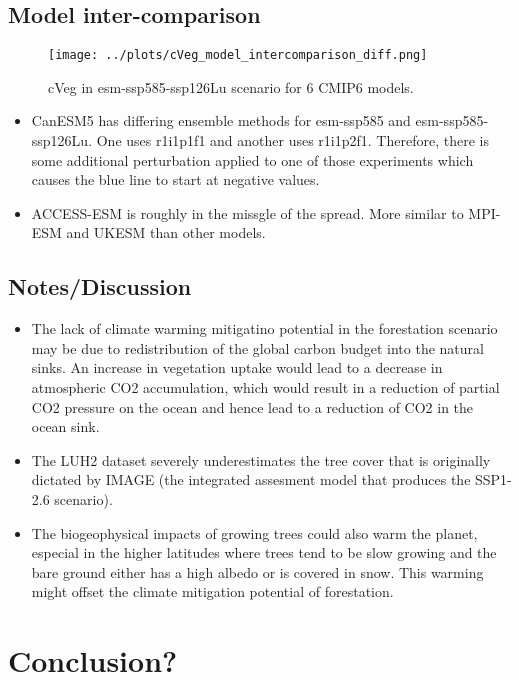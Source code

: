\documentclass[]{article}
\begin{document}
\subsection{Model inter-comparison}

\begin{figure}[H]
    \centering
    \texttt{[image: ../plots/cVeg\_model\_intercomparison\_diff.png]}
    \caption{cVeg in esm-ssp585-ssp126Lu scenario for 6 CMIP6 models.}
    \label{fig:models}
\end{figure}

\begin{itemize}
    \item CanESM5 has differing ensemble methods for esm-ssp585 and esm-ssp585-ssp126Lu. One uses r1i1p1f1 and another uses r1i1p2f1. Therefore, there is some additional perturbation applied to one of those experiments which causes the blue line to start at negative values.
    \item ACCESS-ESM is roughly in the missgle of the spread. More similar to MPI-ESM and UKESM than other models.
\end{itemize}

\subsection{Notes/Discussion}

\begin{itemize}
    \item The lack of climate warming mitigatino potential in the forestation scenario may be due to redistribution of the global carbon budget into the natural sinks.
        An increase in vegetation uptake would lead to a decrease in atmospheric CO2 accumulation, which would result in a reduction of partial CO2 pressure on the ocean and hence lead to a reduction of CO2 in the ocean sink.
    \item The LUH2 dataset severely underestimates the tree cover that is originally dictated by IMAGE (the integrated assesment model that produces the SSP1-2.6 scenario).
    \item The biogeophysical impacts of growing trees could also warm the planet, especial in the higher latitudes where trees tend to be slow growing and the bare ground either has a high albedo or is covered in snow. This warming might offset the climate mitigation potential of forestation.
\end{itemize}

\section{Conclusion?}

\printbibliography
\end{document}

